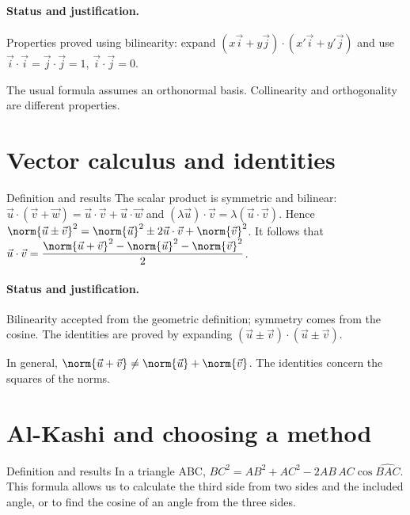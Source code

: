 \paragraph{Status and justification.} Properties proved using bilinearity: expand $(x\vec i+y\vec j)\cdot(x\prime\vec i+y\prime\vec j)$ and use $\vec i\cdot\vec i=\vec j\cdot\vec j=1$, $\vec i\cdot\vec j=0$.
\label{C03-EX2}
\begin{erreur}The usual formula assumes an orthonormal basis. Collinearity and orthogonality are different properties.\end{erreur}
\label{C03-AP2}
\section{Vector calculus and identities}\label{C03-U3}
\begin{repere}{Definition and results}
The scalar product is symmetric and bilinear: $\vec u\cdot(\vec v+\vec w)=\vec u\cdot\vec v+\vec u\cdot\vec w$ and $(\lambda\vec u)\cdot\vec v=\lambda(\vec u\cdot\vec v)$. Hence $\norm{\vec u\pm\vec v}^2=\norm{\vec u}^2\pm2\vec u\cdot\vec v+\norm{\vec v}^2$. It follows that $\vec u\cdot \vec v=\dfrac{\norm{\vec u+\vec v}^2-\norm{\vec u}^2-\norm{\vec v}^2}{2}$.
\end{repere}
\paragraph{Status and justification.} Bilinearity accepted from the geometric definition; symmetry comes from the cosine. The identities are proved by expanding $(\vec u\pm\vec v)\cdot(\vec u\pm\vec v)$.
\label{C03-EX3}
\begin{erreur}In general, $\norm{\vec u+\vec v}\ne\norm{\vec u}+\norm{\vec v}$. The identities concern the squares of the norms.\end{erreur}
\label{C03-AP3}
\section{Al-Kashi and choosing a method}\label{C03-U4}
\begin{repere}{Definition and results}
In a triangle ABC, $BC^2=AB^2+AC^2-2AB\,AC\cos\widehat{BAC}$. This formula allows us to calculate the third side from two sides and the included angle, or to find the cosine of an angle from the three sides.
\end{repere}
